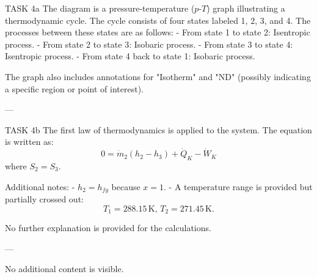 TASK 4a  
The diagram is a pressure-temperature (\( p \)-\( T \)) graph illustrating a thermodynamic cycle. The cycle consists of four states labeled 1, 2, 3, and 4. The processes between these states are as follows:  
- From state 1 to state 2: Isentropic process.  
- From state 2 to state 3: Isobaric process.  
- From state 3 to state 4: Isentropic process.  
- From state 4 back to state 1: Isobaric process.  

The graph also includes annotations for "Isotherm" and "ND" (possibly indicating a specific region or point of interest).  

---

TASK 4b  
The first law of thermodynamics is applied to the system. The equation is written as:  
\[
0 = \dot{m}_2 \left( h_2 - h_3 \right) + \dot{Q}_K - \dot{W}_K
\]  
where \( S_2 = S_3 \).  

Additional notes:  
- \( h_2 = h_{fg} \) because \( x = 1 \).  
- A temperature range is provided but partially crossed out:  
  \[
  T_1 = 288.15 \, \text{K}, \, T_2 = 271.45 \, \text{K}.
  \]  

No further explanation is provided for the calculations.  

--- 

No additional content is visible.